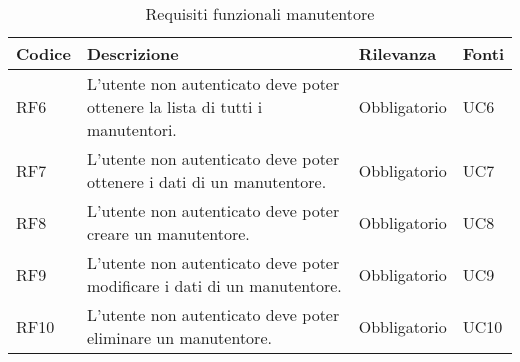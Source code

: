 \begin{table}[H]
    \begin{tabular}{|p{1cm}|p{6cm}|p{1.9cm}|p{1.8cm}|} 
    \hline
    Codice & Descrizione & Rilevanza &  Fonti \\ 
    \hline
    RF6 & L'utente non autenticato deve poter ottenere la lista di tutti i manutentori. & Obbligatorio & UC6 \\ 
    \hline
    RF7 & L'utente non autenticato deve poter ottenere i dati di un manutentore. & Obbligatorio & UC7 \\ 
    \hline
    RF8 & L'utente non autenticato deve poter creare un manutentore. & Obbligatorio & UC8 \\ 
    \hline
    RF9 & L'utente non autenticato deve poter modificare i dati di un manutentore. & Obbligatorio & UC9 \\
    \hline
    RF10 & L'utente non autenticato deve poter eliminare un manutentore. & Obbligatorio & UC10 \\ 
    \hline
    \end{tabular}
    \caption{Requisiti funzionali manutentore}
\end{table}

